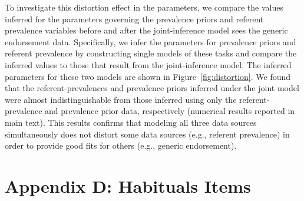 \documentclass[english,,man,floatsintext]{apa6}
\theoremstyle{definition}
\theoremstyle{definition}
\theoremstyle{definition}
\theoremstyle{remark}
\begin{document}
To investigate this distortion effect in the parameters, we compare the
values inferred for the parameters governing the prevalence priors and
referent prevalence variables before and after the joint-inference model
sees the generic endorsement data. Specifically, we infer the parameters
for prevalence priors and referent prevalence by constructing single
models of these tasks and compare the inferred values to those that
result from the joint-inference model. The inferred parameters for these
two models are shown in Figure~\ref{fig:distortion}. We found that the
referent-prevalences and prevalence priors inferred under the joint
model were almost indistinguishable from those inferred using only the
referent-prevalence and prevalence prior data, respectively (numerical
results reported in main text). This results confirms that modeling all
three data sources simultaneously does not distort some data sources
(e.g., referent prevalence) in order to provide good fits for others
(e.g., generic endorsement).

\newpage

\hypertarget{appendix-d-habituals-items}{%
\section{Appendix D: Habituals Items}\label{appendix-d-habituals-items}}
\end{document}
